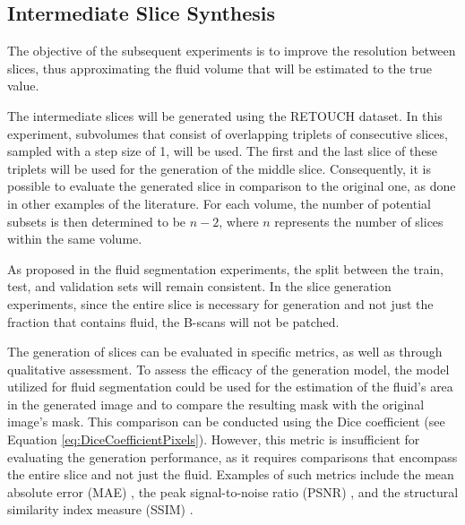 \subsection{Intermediate Slice Synthesis}
The objective of the subsequent experiments is to improve the resolution between slices, thus approximating the fluid volume that will be estimated to the true value.
\par
The intermediate slices will be generated using the RETOUCH dataset. In this experiment, subvolumes that consist of overlapping triplets of consecutive slices, sampled with a step size of 1, will be used. The first and the last slice of these triplets will be used for the generation of the middle slice. Consequently, it is possible to evaluate the generated slice in comparison to the original one, as done in other examples of the literature. For each volume, the number of potential subsets is then determined to be $n-2$, where $n$ represents the number of slices within the same volume.
\par
As proposed in the fluid segmentation experiments, the split between the train, test, and validation sets will remain consistent. In the slice generation experiments, since the entire slice is necessary for generation and not just the fraction that contains fluid, the B-scans will not be patched.
\par
The generation of slices can be evaluated in specific metrics, as well as through qualitative assessment. To assess the efficacy of the generation model, the model utilized for fluid segmentation could be used for the estimation of the fluid's area in the generated image and to compare the resulting mask with the original image's mask. This comparison can be conducted using the Dice coefficient \parencite{Lopez2023} (see Equation \ref{eq:DiceCoefficientPixels}). However, this metric is insufficient for evaluating the generation performance, as it requires comparisons that encompass the entire slice and not just the fluid. Examples of such metrics include the mean absolute error (MAE) \parencite{Lopez2023, Wu2022, Zhang2022}, the peak signal-to-noise ratio (PSNR) \parencite{Xia2021, YChen2018, Sanchez2018, Fang2022, Nimitha2024, Kudo2019, You2020, Zhang2024, Zhang2022}, and the structural similarity index measure (SSIM) \parencite{YChen2018, Sanchez2018, Fang2022, Nimitha2024, Kudo2019, You2020, Zhang2024, Zhang2022}.

